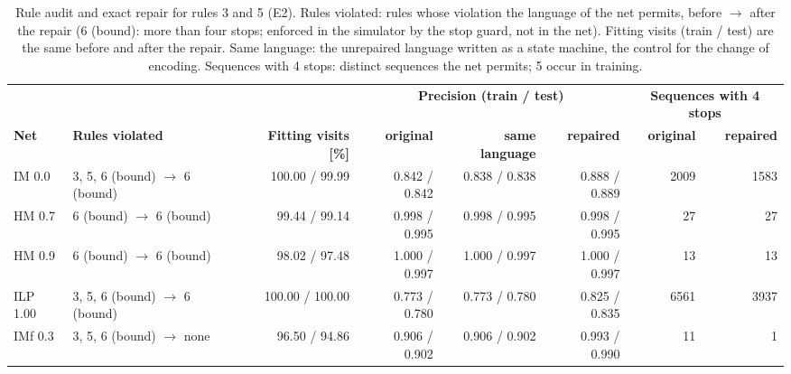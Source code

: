 \begin{table}[htbp]
\centering
\footnotesize
\setlength{\tabcolsep}{3pt}
\begin{tabular}{llrrrrrr}
\toprule
 & & & \multicolumn{3}{c}{\textbf{Precision (train / test)}} & \multicolumn{2}{c}{\textbf{Sequences with 4 stops}} \\
\textbf{Net} & \textbf{Rules violated} & \textbf{Fitting visits [\%]} & \textbf{original} & \textbf{same language} & \textbf{repaired} & \textbf{original} & \textbf{repaired} \\
\midrule
IM 0.0 & 3, 5, 6 (bound) $\rightarrow$ 6 (bound) & 100.00 / 99.99 & 0.842 / 0.842 & 0.838 / 0.838 & 0.888 / 0.889 & 2009 & 1583 \\
HM 0.7 & 6 (bound) $\rightarrow$ 6 (bound) & 99.44 / 99.14 & 0.998 / 0.995 & 0.998 / 0.995 & 0.998 / 0.995 & 27 & 27 \\
HM 0.9 & 6 (bound) $\rightarrow$ 6 (bound) & 98.02 / 97.48 & 1.000 / 0.997 & 1.000 / 0.997 & 1.000 / 0.997 & 13 & 13 \\
ILP 1.00 & 3, 5, 6 (bound) $\rightarrow$ 6 (bound) & 100.00 / 100.00 & 0.773 / 0.780 & 0.773 / 0.780 & 0.825 / 0.835 & 6561 & 3937 \\
IMf 0.3 & 3, 5, 6 (bound) $\rightarrow$ none & 96.50 / 94.86 & 0.906 / 0.902 & 0.906 / 0.902 & 0.993 / 0.990 & 11 & 1 \\
\bottomrule
\end{tabular}
\caption{Rule audit and exact repair for rules 3 and 5 (E2). Rules violated: rules whose violation the language of the net permits, before $\rightarrow$ after the repair (6 (bound): more than four stops; enforced in the simulator by the stop guard, not in the net). Fitting visits (train / test) are the same before and after the repair. Same language: the unrepaired language written as a state machine, the control for the change of encoding. Sequences with 4 stops: distinct sequences the net permits; 5 occur in training.}
\label{tab:rq1_e2_repair}
\end{table}
